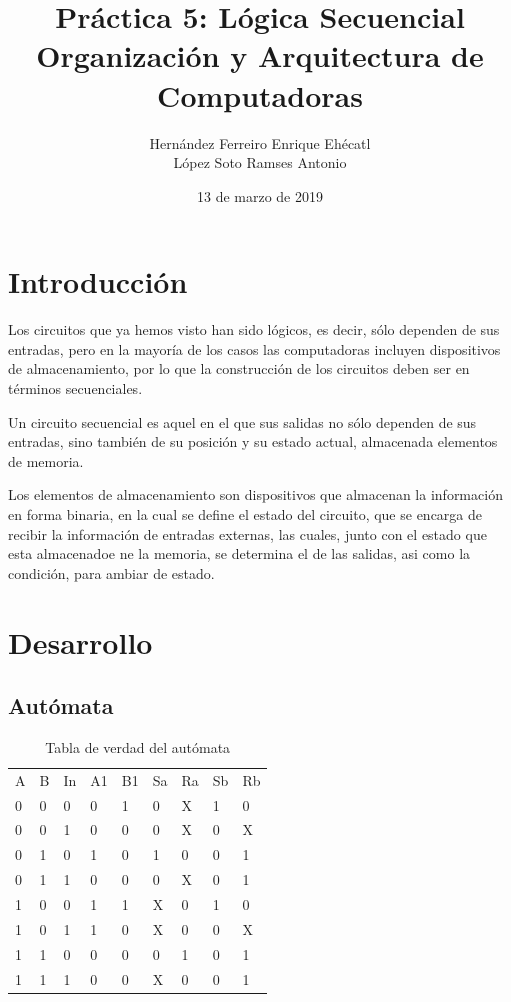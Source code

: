 \documentclass[12pt, letterpaper]{article}
\author{Hernández Ferreiro Enrique Ehécatl \\
          López Soto Ramses Antonio}
\title{Práctica 5: Lógica Secuencial \\
                {\small Organización y Arquitectura de Computadoras}}
\date{13 de marzo de 2019}
\begin{document}
    \maketitle

    \section{Introducción}

      \hspace{.5cm}
      Los circuitos que ya hemos visto han sido lógicos, es decir, sólo dependen
      de sus entradas, pero en la mayoría de los casos las computadoras incluyen
      dispositivos de almacenamiento, por lo que la construcción de los circuitos
      deben ser en términos secuenciales.\vspace{.3cm}

      Un circuito secuencial es aquel en el que sus salidas no sólo dependen de
      sus entradas, sino también de su posición y su estado actual, almacenada
      elementos de memoria.\vspace{.3cm}

      Los elementos de almacenamiento son dispositivos que almacenan la
      información en forma binaria, en la cual se define el estado del circuito,
      que se encarga de recibir la información de entradas externas, las cuales,
      junto con el estado que esta almacenadoe ne la memoria, se determina el
      de las salidas, asi como la condición, para ambiar de estado.

    \section{Desarrollo}
      \subsection*{Autómata}
        \begin{center}
          \begin{table}[htb]
            \begin{tabular}{lllllllll}
              A & B & In & A1 & B1 & Sa & Ra & Sb & Rb \\
              0 & 0 & 0  & 0  & 1  & 0  & X  & 1  & 0  \\
              0 & 0 & 1  & 0  & 0  & 0  & X  & 0  & X  \\
              0 & 1 & 0  & 1  & 0  & 1  & 0  & 0  & 1  \\
              0 & 1 & 1  & 0  & 0  & 0  & X  & 0  & 1  \\
              1 & 0 & 0  & 1  & 1  & X  & 0  & 1  & 0  \\
              1 & 0 & 1  & 1  & 0  & X  & 0  & 0  & X  \\
              1 & 1 & 0  & 0  & 0  & 0  & 1  & 0  & 1  \\
              1 & 1 & 1  & 0  & 0  & X  & 0  & 0  & 1
            \end{tabular}
            \caption{Tabla de verdad del autómata}
          \end{table}
        \end{center}
\end{document}
